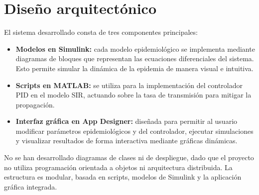 \section{Diseño arquitectónico}
El sistema desarrollado consta de tres componentes principales:

\begin{itemize}
    \item \textbf{Modelos en Simulink:} cada modelo epidemiológico se implementa mediante diagramas de bloques que representan las ecuaciones diferenciales del sistema. Esto permite simular la dinámica de la epidemia de manera visual e intuitiva.

    \item \textbf{Scripts en MATLAB:} se utiliza para la implementación del controlador PID en el modelo SIR, actuando sobre la tasa de transmisión para mitigar la propagación.

    \item \textbf{Interfaz gráfica en App Designer:} diseñada para permitir al usuario modificar parámetros epidemiológicos y del controlador, ejecutar simulaciones y visualizar resultados de forma interactiva mediante gráficas dinámicas.
\end{itemize}


No se han desarrollado diagramas de clases ni de despliegue, dado que el proyecto no utiliza programación orientada a objetos ni arquitectura distribuida. La estructura es modular, basada en scripts, modelos de Simulink y la aplicación gráfica integrada.

